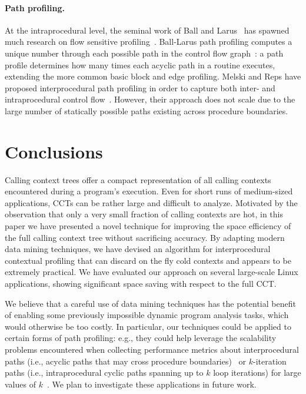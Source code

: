\documentclass{sigplanconf}
\begin{document}
\paragraph{Path profiling.} At the intraprocedural level,  the seminal work of Ball and Larus~\cite{BL96} has spawned much research on flow sensitive profiling~\cite{ABL97, BMS98, L99, AH02, AL04, JBZ04, VNC07, BM05, BM05b}. Ball-Larus path profiling computes a unique number through each possible path in the control flow graph~\cite{BL96}: a path profile determines how many times each acyclic path in a routine executes, extending the more common basic block and edge profiling. Melski and Reps have proposed interprocedural path profiling in order to capture both inter- and intraprocedural control flow~\cite{MR99}. However, their approach does not scale due to the large number of statically possible paths existing across procedure boundaries.

\section{Conclusions}
\label{se:conclusion}

Calling context trees offer a compact representation of all calling contexts encountered during a program's execution. Even for short runs of medium-sized applications, CCTs can be rather large and difficult to analyze. Motivated by the observation that only a very small fraction of calling contexts are hot, in this paper we have presented a novel technique for improving the space efficiency of the full calling context tree without sacrificing accuracy. By adapting modern data mining techniques, we have devised an algorithm for interprocedural contextual profiling that can discard on the fly cold contexts and appears to be extremely practical. We have evaluated our approach on several large-scale Linux applications, showing significant space saving with respect to the full CCT.

We believe that a careful use of data mining techniques has the potential benefit of enabling some previously impossible dynamic program analysis tasks, which would otherwise be too costly. In particular, our techniques could be applied to certain forms of path profiling: e.g., they could help leverage the scalability problems encountered when collecting performance metrics about interprocedural paths (i.e., acyclic paths that may cross procedure boundaries)~\cite{MR99} or $k$-iteration paths (i.e., intraprocedural cyclic paths spanning up to $k$ loop iterations) for large values of $k$~\cite{SS09}. We plan to investigate these applications in future work.
\end{document}

